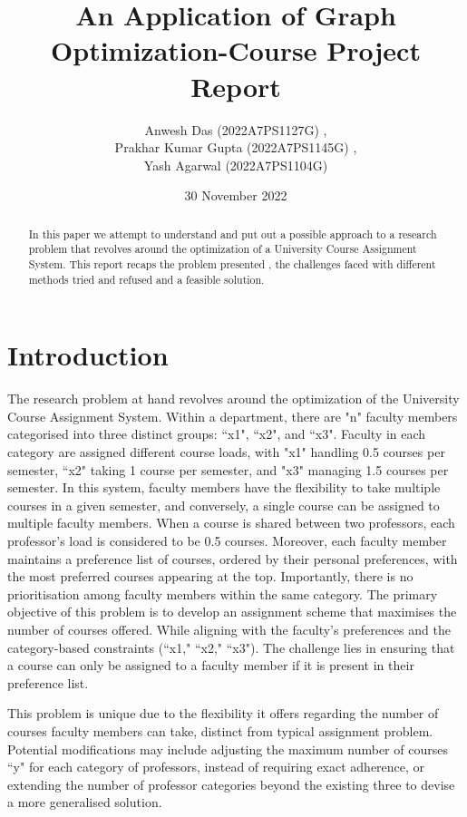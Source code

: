\documentclass[12pt, letterpaper]{article}
\title{An Application of Graph Optimization-Course Project Report}
\author{Anwesh Das (2022A7PS1127G) , \\Prakhar Kumar Gupta (2022A7PS1145G) ,\\ Yash Agarwal (2022A7PS1104G)}
\date{30 November 2022}
\begin{document}
\maketitle
\begin{abstract}
In this paper we attempt to understand and put out a possible approach to  a research problem that revolves around the optimization of a University Course Assignment System. This report  recaps the problem presented , the challenges faced with different methods tried and refused and a feasible solution.
\end{abstract}
\section{Introduction}
\label{section:intro}
 The research problem at hand revolves around the optimization of the University Course Assignment System. Within a department, there are "n" faculty members categorised into three distinct groups: ``x1", ``x2", and ``x3". Faculty in each category are assigned different course loads, with "x1" handling 0.5 courses per semester, ``x2" taking 1 course per semester, and "x3" managing 1.5 courses per semester. In this system, faculty members have the flexibility to take multiple courses in a given semester, and conversely, a single course can be assigned to multiple faculty members. When a course is shared between two professors, each professor's load is considered to be 0.5 courses. Moreover, each faculty member maintains a preference list of courses, ordered by their personal preferences, with the most preferred courses appearing at the top. Importantly, there is no prioritisation among faculty members within the same category. The primary objective of this problem is to develop an assignment scheme that maximises the number of courses offered. While aligning with the faculty’s preferences and the category-based constraints (``x1," ``x2," ``x3"). The challenge lies in ensuring that a course can only be assigned to a faculty member if it is present in their preference list.

 This problem is unique due to the flexibility it offers regarding the number of courses faculty members can take, distinct from typical assignment problem. Potential modifications may include adjusting the maximum number of courses ``y" for each category of professors, instead of requiring exact adherence, or extending the number of professor categories beyond the existing three to devise a more generalised solution.
\end{document}
